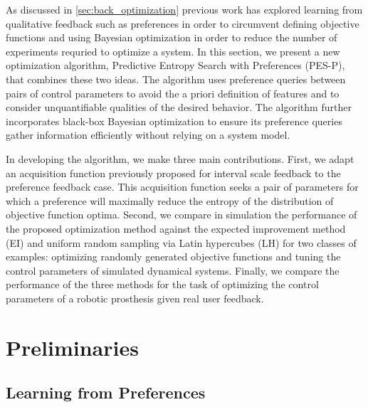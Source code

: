As discussed in \cref{sec:back_optimization} previous work has explored learning
from qualitative feedback such as preferences in order to circumvent defining
objective functions and using Bayesian optimization in order to reduce the
number of experiments requried to optimize a system. In this section, we present
a new optimization algorithm, Predictive Entropy Search with Preferences
(PES-P), that combines these two ideas. The algorithm uses preference queries
between pairs of control parameters to avoid the a priori definition of features
and to consider unquantifiable qualities of the desired behavior. The algorithm
further incorporates black-box Bayesian optimization to ensure its preference
queries gather information efficiently without relying on a system model.

In developing the algorithm, we make three main contributions. First, we adapt
an acquisition function previously proposed for interval scale feedback to the
preference feedback case. This acquisition function seeks a pair of parameters
for which a preference will maximally reduce the entropy of the distribution of
objective function optima. Second, we compare in simulation the performance of
the proposed optimization method against the expected improvement method (EI)
and uniform random sampling via Latin hypercubes (LH) for two classes of
examples: optimizing randomly generated objective functions and tuning the
control parameters of simulated dynamical systems.  Finally, we compare the
performance of the three methods for the task of optimizing the control
parameters of a robotic prosthesis given real user feedback.

\section{Preliminaries} 
\subsection{Learning from Preferences}

